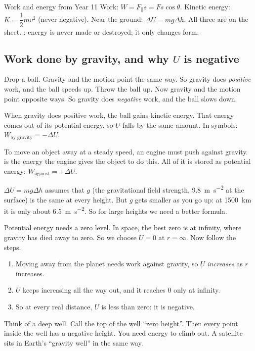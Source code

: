 \begin{keywords}
\end{keywords}

\begin{refresher}{Work and energy from Year 11}
Work: $W = F_\parallel s = Fs\cos\theta$. Kinetic energy: $K = \dfrac{1}{2}mv^2$
(never negative). Near the ground: $\Delta U = mg\Delta h$. All three are on the
sheet. : energy is never made or destroyed; it only
changes form.
\end{refresher}

\subsection{Work done by gravity, and why $U$ is negative}

Drop a ball. Gravity and the motion point the same way. So gravity does
\emph{positive} work, and the ball speeds up. Throw the ball up. Now gravity and
the motion point opposite ways. So gravity does \emph{negative} work, and the
ball slows down.

When gravity does positive work, the ball gains kinetic energy. That energy
comes out of its potential energy, so $U$ falls by the same amount. In symbols:
$W_\text{by gravity} = -\Delta U$.

To move an object away at a steady speed, an engine must push against gravity.
 is the energy the engine gives the object to do
this. All of it is stored as potential energy: $W_\text{against} = +\Delta U$.

$\Delta U = mg\Delta h$ assumes that $g$ (the gravitational field strength,
\qty{9.8}{m.s^{-2}} at the surface) is the same at every height. But $g$
gets smaller as you go up: at \qty{1500}{km} it is only about
\qty{6.5}{m.s^{-2}}. So for large heights we need a better formula.

Potential energy needs a zero level. In space, the best zero is at infinity,
where gravity has died away to zero. So we choose $U = 0$ at $r = \infty$. Now follow the steps.
\begin{enumerate}
  \item Moving away from the planet needs work against gravity, so $U$
        \emph{increases} as $r$ increases.
  \item $U$ keeps increasing all the way out, and it reaches 0 only at infinity.
  \item So at every real distance, $U$ is less than zero: it is negative.
\end{enumerate}
Think of a deep well. Call the top of the well ``zero height''. Then every point
inside the well has a negative height. You need energy to climb out. A satellite
sits in Earth's ``gravity well'' in the same way.

